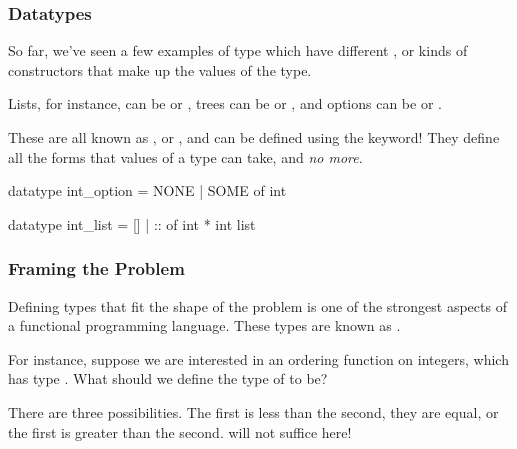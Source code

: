 \documentclass[aspectratio=169]{beamer}
\begin{document}
\begin{frame}[fragile]
  \frametitle{Datatypes}

  So far, we've seen a few examples of type which have different ,
  or kinds of constructors that make up the values of the type.

  \pause
  \vspace{\fill}

  Lists, for instance, can be \code{[]} or , trees can be 
  or , and options can be  or .

  \pause
  \vspace{\fill}

  These are all known as , or , and can be
  defined using the  keyword! They define all the forms that
  values of a type can take, and \textit{no more}.

  \pause
  \vspace{\fill}

  \begin{codeblock}
    datatype int_option = NONE | SOME of int

    datatype int_list = [] | :: of int * int list
  \end{codeblock}
\end{frame}

\begin{frame}[fragile]
  \frametitle{Framing the Problem}

  Defining types that fit the shape of the problem is one of the strongest
  aspects of a functional programming language. These types are known as
  .

  \pause
  \vspace{\fill}

  For instance, suppose we are interested in an ordering function on integers,
  which has type . What should we define the type of
   to be?

  \pause
  \vspace{\fill}

  There are three possibilities. The first is less than the second, they are
  equal, or the first is greater than the second.  will not suffice
  here!
\end{frame}
\end{document}
